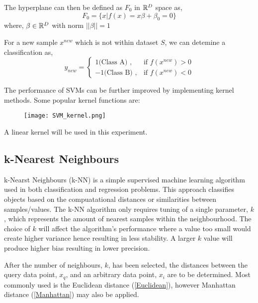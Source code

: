 The hyperplane can then be defined as $F_0$ in $\mathbb{R}^D$ space as,
\begin{equation}
    F_0 = \big \{x|f(x) = x \beta + \beta_0 = 0 \big \} 
\end{equation}  
where, 
$\beta \in \mathbb{R}^D$ with norm $||\beta|| = 1$

For a new sample $x^{new}$ which is not within dataset $S$, we can detemine a classification as,
\begin{equation}
    y_{new} = \begin{cases}
        1 \text{(Class A) }, & \text{if } f(x^{new}) > 0 \\
        -1 \text{(Class B) }, & \text{if } f(x^{new}) < 0
    \end{cases}
\end{equation}

The performance of SVMs can be further improved by implementing kernel methods. Some popular kernel functions are:
\begin{figure}[h]
    \texttt{[image: SVM\_kernel.png]}
    \centering
    \label{fig:kernel}
\end{figure}

A linear kernel will be used in this experiment.



\subsection{k-Nearest Neighbours}
k-Nearst Neighbours (k-NN) is a simple supervised machine learning algorithm used in both classification and regression problems. 
This approach classifies objects based on the compuatational distances or similarities between samples/values.
The k-NN algorithm only requires tuning of a single parameter, $k$, which represents the amount of nearest samples within the neighbourhood.
The choice of $k$ will affect the algorithm's performance where a value too small would create higher variance hence resulting in less stability.
A larger $k$ value will produce higher bias resulting in lower precision. 

After the number of neighbours, $k$, has been selected, the distances between the query data point, $x_q$, and an arbitrary data point, $x_i$ are to be determined.
Most commonly used is the Euclidean distance (\ref{Euclidean}), however Manhattan distance (\ref{Manhattan}) may also be applied.

